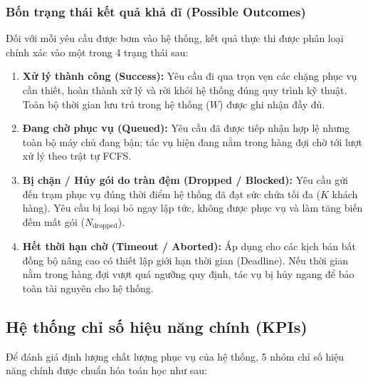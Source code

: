 \subsubsection{Bốn trạng thái kết quả khả dĩ (Possible Outcomes)}

\hspace{0.5cm}Đối với mỗi yêu cầu được bơm vào hệ thống, kết quả thực thi được phân loại chính xác vào một trong 4 trạng thái sau:
\begin{enumerate}[leftmargin=1.5em]
    \item \textbf{Xử lý thành công (Success):} Yêu cầu đi qua trọn vẹn các chặng phục vụ cần thiết, hoàn thành xử lý và rời khỏi hệ thống đúng quy trình kỹ thuật. Toàn bộ thời gian lưu trú trong hệ thống ($W$) được ghi nhận đầy đủ.
    \item \textbf{Đang chờ phục vụ (Queued):} Yêu cầu đã được tiếp nhận hợp lệ nhưng toàn bộ máy chủ đang bận; tác vụ hiện đang nằm trong hàng đợi chờ tới lượt xử lý theo trật tự FCFS.
    \item \textbf{Bị chặn / Hủy gói do tràn đệm (Dropped / Blocked):} Yêu cầu gửi đến trạm phục vụ đúng thời điểm hệ thống đã đạt sức chứa tối đa ($K$ khách hàng). Yêu cầu bị loại bỏ ngay lập tức, không được phục vụ và làm tăng biến đếm mất gói ($N_{\text{dropped}}$).
    \item \textbf{Hết thời hạn chờ (Timeout / Aborted):} Áp dụng cho các kịch bản bất đồng bộ nâng cao có thiết lập giới hạn thời gian (Deadline). Nếu thời gian nằm trong hàng đợi vượt quá ngưỡng quy định, tác vụ bị hủy ngang để bảo toàn tài nguyên cho hệ thống.
\end{enumerate}

\subsection{Hệ thống chỉ số hiệu năng chính (KPIs)}
\label{subsec:chi-so-hieu-nang}

\hspace{0.5cm}Để đánh giá định lượng chất lượng phục vụ của hệ thống, 5 nhóm chỉ số hiệu năng chính được chuẩn hóa toán học như sau:

